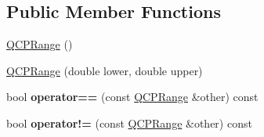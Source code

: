\subsection*{Public Member Functions}
\begin{DoxyCompactItemize}
\item 
\hyperlink{classQCPRange_aca158d7e69702cee5d77d10a269b01e2}{Q\+C\+P\+Range} ()
\item 
\hyperlink{classQCPRange_a1d9d84d084c8f368fdedd42e0978d405}{Q\+C\+P\+Range} (double lower, double upper)
\item 
bool {\bfseries operator==} (const \hyperlink{classQCPRange}{Q\+C\+P\+Range} \&other) const \hypertarget{classQCPRange_aa20f91509687505e25bd2ef10d2f0e15}{}\label{classQCPRange_aa20f91509687505e25bd2ef10d2f0e15}

\item 
bool {\bfseries operator!=} (const \hyperlink{classQCPRange}{Q\+C\+P\+Range} \&other) const \hypertarget{classQCPRange_a9b9016ee83dea60573abb9a5ef4cdbcb}{}\label{classQCPRange_a9b9016ee83dea60573abb9a5ef4cdbcb}


\end{DoxyCompactItemize}

